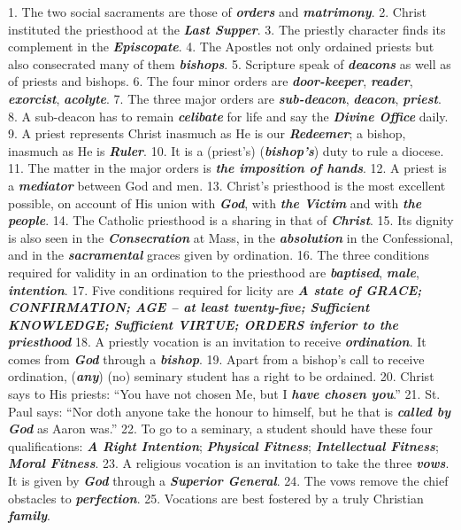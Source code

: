 \documentclass[a4paper,14pt]{memoir}
\newcommand\answer[1]{\textbf{\textit{#1}}}
\begin{document}
1. The two social sacraments are those of \answer{orders} and  \answer{matrimony}.  
2.  Christ
instituted the priesthood at the \answer{Last Supper}. 
3. The priestly  character  finds
its complement in the \answer{Episcopate}. 
4. The Apostles not  only  ordained  priests
but also consecrated many of them \answer{bishops}. 
5. Scripture speak of \answer{deacons}
as well as of priests and bishops. 
6. The four minor  orders  are  \answer{door-keeper},
\answer{reader}, \answer{exorcist}, \answer{acolyte}.  
7.  The  three  major  orders  are  \answer{sub-deacon},
\answer{deacon}, \answer{priest}. 
8. A sub-deacon has to remain \answer{celibate} for  life  and
say the \answer{Divine Office} daily. 
9. A priest represents Christ inasmuch as He is  our
\answer{Redeemer}; a bishop, inasmuch as He is  \answer{Ruler}.  
10.  It  is  a  (priest's)
(\answer{bishop's}) duty to rule a diocese. 
11. The matter in  the  major  orders  is
\answer{the imposition of hands}. 
12. A priest is a \answer{mediator}  between  God  and  men.  
13.  Christ's
priesthood is the most excellent possible, on  account  of  His  union  with
\answer{God}, with \answer{the Victim} and with \answer{the people}. 
14. The Catholic priesthood is  a
sharing in that of \answer{Christ}. 
15. Its dignity is also seen  in  the  \answer{Consecration}
at Mass, in the \answer{absolution} in the Confessional, and  in  the  \answer{sacramental}  graces
given by ordination. 
16. The three conditions required for  validity  in  an
ordination to the priesthood are  \answer{baptised},  \answer{male},  \answer{intention}.  
17.  Five
conditions required for licity are \answer{A state of GRACE; CONFIRMATION; AGE – at least twenty-five; Sufficient KNOWLEDGE; Sufficient VIRTUE; ORDERS inferior to the priesthood}
18. A priestly vocation is an invitation to receive  \answer{ordination}.  It
comes from \answer{God} through a \answer{bishop}. 
19. Apart from a  bishop's  call  to
receive ordination, (\answer{any}) (no) seminary student has a right to be  ordained.
20. Christ says to His priests: ``You have not chosen Me,  but  I  \answer{have chosen you}.''
21. St. Paul says: ``Nor doth anyone take the honour to himself, but he  that
is \answer{called by God} as Aaron was.''
22. To go to a seminary, a  student  should  have
these four  qualifications:  \answer{A Right Intention};  \answer{Physical Fitness};  \answer{Intellectual Fitness};  \answer{Moral Fitness}.  
23.  A
religious vocation is an invitation to take the three \answer{vows}. It is  given
by \answer{God} through a \answer{Superior General}. 
24. The vows remove the chief  obstacles  to
\answer{perfection}. 
25. Vocations are best fostered by a truly Christian \answer{family}.
\end{document}
